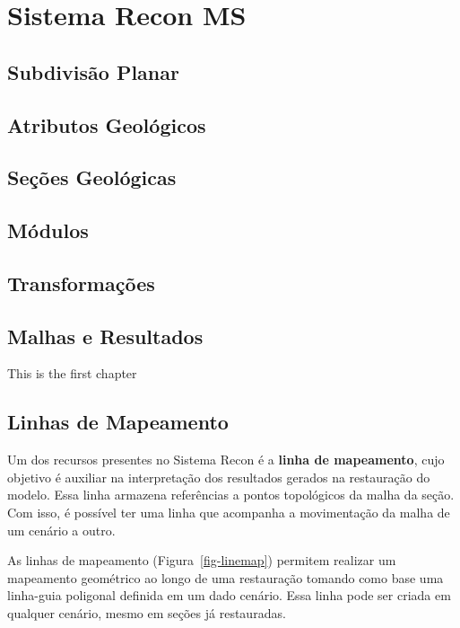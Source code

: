 
\chapter{Sistema Recon MS}

\section{Subdivisão Planar} %

\section{Atributos Geológicos}

\section{Seções Geológicas} %

\section{Módulos}

\section{Transformações}

\section{Malhas e Resultados}

This is the first chapter

\section{Linhas de Mapeamento}

Um dos recursos presentes no Sistema Recon é a \textbf{linha de mapeamento}, cujo objetivo é auxiliar na interpretação dos resultados gerados na restauração do modelo. Essa linha armazena referências a pontos topológicos da malha da seção. Com isso, é possível ter uma linha que acompanha a movimentação da malha de um cenário a outro.

As linhas de mapeamento (Figura~\ref{fig-linemap}) permitem realizar um mapeamento geométrico ao longo de uma restauração tomando como base uma linha-guia poligonal definida em um dado cenário. Essa linha pode ser criada em qualquer cenário, mesmo em seções já restauradas.

